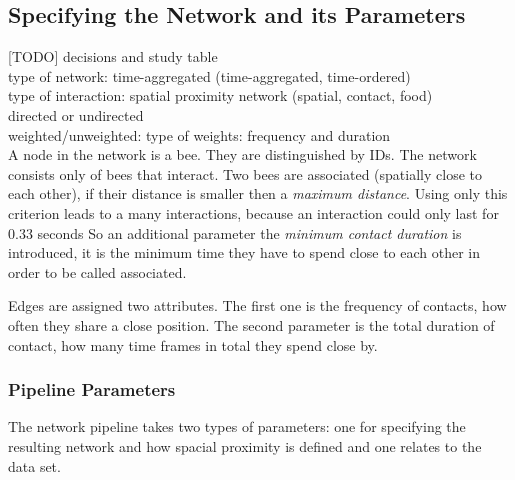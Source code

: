 \subsection{Specifying the Network and its Parameters}
[TODO] decisions and study table\\
type of network: time-aggregated (time-aggregated, time-ordered)\\
type of interaction: spatial proximity network (spatial, contact, food)\\
directed or undirected\\
weighted/unweighted: type of weights: frequency and duration\\

A node in the network is a bee.
They are distinguished by IDs.
The network consists only of bees that interact.
Two bees are associated (spatially close to each other), if their distance is smaller then a \emph{maximum distance}.
Using only this criterion leads to a many interactions, because an interaction could only last for $0.33$ seconds
So an additional parameter the \emph{minimum contact duration} is introduced, it is the minimum time they have to spend close to each other in order to be called associated.

Edges are assigned two attributes. The first one is the frequency of contacts, how often they share a close position. The second parameter is the total duration of contact, how many time frames in total they spend close by.

\subsubsection{Pipeline Parameters}
The network pipeline takes two types of parameters: one for specifying the resulting network and how spacial proximity is defined and one relates to the data set.


